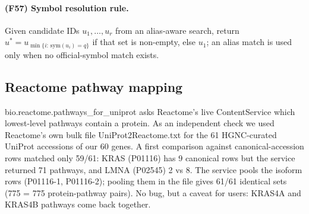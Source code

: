\paragraph{(F57) Symbol resolution rule.} Given candidate IDs $u_1,\dots,u_r$ from an alias-aware search, return $u^*=u_{\min\{i:\,\mathrm{sym}(u_i)=q\}}$ if that set is non-empty, else $u_1$; an alias match is used only when no official-symbol match exists.
\subsection{Reactome pathway mapping}
bio.reactome.pathways\_for\_uniprot asks Reactome's live ContentService which lowest-level pathways contain a protein. As an independent check we used Reactome's own bulk file UniProt2Reactome.txt for the 61 HGNC-curated UniProt accessions of our 60 genes. A first comparison against canonical-accession rows matched only 59/61: KRAS (P01116) has 9 canonical rows but the service returned 71 pathways, and LMNA (P02545) 2 vs 8. The service pools the isoform rows (P01116-1, P01116-2); pooling them in the file gives 61/61 identical sets (775 = 775 protein-pathway pairs). No bug, but a caveat for users: KRAS4A and KRAS4B pathways come back together.
